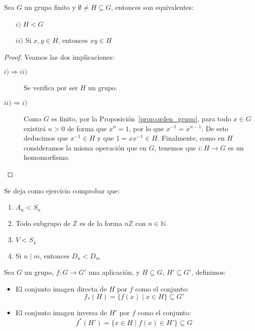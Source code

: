 \begin{prop}
    Sea $G$ un grupo finito y $\emptyset \neq H \subseteq G$, entonces son equivalentes:
    \begin{enumerate}
        \item[$i)$] $H < G$
        \item[$ii)$] Si $x,y\in H$, entonces $xy\in H$
    \end{enumerate}
    \begin{proof}
        Veamos las dos implicaciones:
        \begin{description}
            \item [$i)\Longrightarrow ii)$] Se verifica por ser $H$ un grupo.
            \item [$ii)\Longrightarrow i)$] Como $G$ es finito, por la Proposición~\ref{prop:orden_grupo}, para todo $x\in G$ existirá $n>0$ de forma que $x^n = 1$, por lo que $x^{-1} = x^{n-1}$. De esto deducimos que $x^{-1}\in H$ y que $1=xx^{-1}\in H$. Finalmente, como en $H$ consideramos la misma operación que en $G$, tenemos que $i:H\to G$ es un homomorfismo.
        \end{description}
    \end{proof}
\end{prop}

\begin{ejemplo}
    Se deja como ejercicio comprobar que:
    \begin{enumerate}
        \item $A_n < S_n$
        \item Todo subgrupo de $\mathbb{Z}$ es de la forma $n\mathbb{Z}$ con $n\in \mathbb{N}$.
        \item $V<S_4$
        \item Si $n\mid m$, entonces $D_n < D_m$
    \end{enumerate}
\end{ejemplo}

\begin{definicion}
    Sea $G$ un grupo, $f:G\to G'$ una aplicación, y $H\subseteq G$, $H'\subseteq G'$, definimos:
    \begin{itemize}
        \item El conjunto imagen directa de $H$ por $f$ como el conjunto:
            \begin{equation*}
                f_\ast(H) = \{f(x) \mid x\in H\}\subseteq G'
            \end{equation*}
        \item El conjunto imagen inversa de $H'$ por $f$ como el conjunto:
            \begin{equation*}
                f^\ast(H') = \{x\in H \mid f(x) \in H'\}\subseteq G
            \end{equation*}
    \end{itemize}
\end{definicion}


